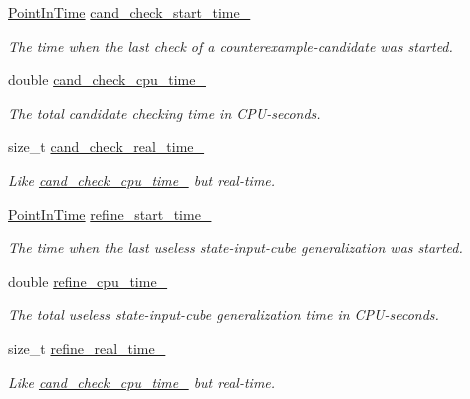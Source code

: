 \begin{DoxyCompactItemize}
\hyperlink{Stopwatch_8h_af3a9f634f27bed7e98dbc23e5c6f807d}{Point\-In\-Time} \hyperlink{classLearnStatisticsSAT_a1effa4c15e4349fb1e6f62ad6c79d6c5}{cand\-\_\-check\-\_\-start\-\_\-time\-\_\-}
\begin{DoxyCompactList}\small\item\em The time when the last check of a counterexample-\/candidate was started. \end{DoxyCompactList}\item 
double \hyperlink{classLearnStatisticsSAT_a2ab5cd522b7a4d700a11c0bb430baa81}{cand\-\_\-check\-\_\-cpu\-\_\-time\-\_\-}
\begin{DoxyCompactList}\small\item\em The total candidate checking time in C\-P\-U-\/seconds. \end{DoxyCompactList}\item 
size\-\_\-t \hyperlink{classLearnStatisticsSAT_a2e0611b0c6f80cbc7b36f25ce5e89db9}{cand\-\_\-check\-\_\-real\-\_\-time\-\_\-}
\begin{DoxyCompactList}\small\item\em Like \hyperlink{classLearnStatisticsSAT_a2ab5cd522b7a4d700a11c0bb430baa81}{cand\-\_\-check\-\_\-cpu\-\_\-time\-\_\-} but real-\/time. \end{DoxyCompactList}\item 
\hyperlink{Stopwatch_8h_af3a9f634f27bed7e98dbc23e5c6f807d}{Point\-In\-Time} \hyperlink{classLearnStatisticsSAT_af358ee7d57095acbb602d9b9e1329dd2}{refine\-\_\-start\-\_\-time\-\_\-}
\begin{DoxyCompactList}\small\item\em The time when the last useless state-\/input-\/cube generalization was started. \end{DoxyCompactList}\item 
double \hyperlink{classLearnStatisticsSAT_ad50f0623e605d349f3221f9e1332805d}{refine\-\_\-cpu\-\_\-time\-\_\-}
\begin{DoxyCompactList}\small\item\em The total useless state-\/input-\/cube generalization time in C\-P\-U-\/seconds. \end{DoxyCompactList}\item 
size\-\_\-t \hyperlink{classLearnStatisticsSAT_aa36efa6b1b2bfef8ca65095952c5c35e}{refine\-\_\-real\-\_\-time\-\_\-}
\begin{DoxyCompactList}\small\item\em Like \hyperlink{classLearnStatisticsSAT_a2ab5cd522b7a4d700a11c0bb430baa81}{cand\-\_\-check\-\_\-cpu\-\_\-time\-\_\-} but real-\/time. \end{DoxyCompactList}\end{DoxyCompactItemize}
